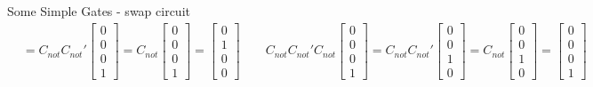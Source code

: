 \documentclass{beamer}
\begin{document}
\begin{frame}{Some Simple Gates - swap circuit}
{\begin{align*}
      &= 
      C_{not} C_{not}' \begin{bmatrix} 0 \\ 0 \\ 0 \\ 1 \end{bmatrix}
      =
      C_{not} \begin{bmatrix} 0 \\ 0 \\ 0 \\ 1 \end{bmatrix}
      =
      \begin{bmatrix} 0 \\ 1 \\ 0 \\ 0 \end{bmatrix} 
      \qquad
      C_{not} C_{not}' C_{not} \begin{bmatrix} 0 \\ 0 \\ 0 \\ 1 \end{bmatrix}
      = 
      C_{not} C_{not}' \begin{bmatrix} 0 \\ 0 \\ 1 \\ 0 \end{bmatrix}
      =
      C_{not} \begin{bmatrix} 0 \\ 0 \\ 1 \\ 0 \end{bmatrix}
      =
      \begin{bmatrix} 0 \\ 0 \\ 0 \\ 1 \end{bmatrix} 
    \end{align*}
  }%
\end{frame}
\end{document}
